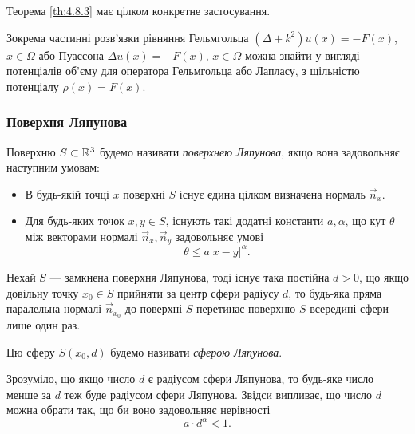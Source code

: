 \begin{remark}
	Теорема \ref{th:4.8.3} має цілком конкретне застосування.
\end{remark}

\begin{example}
	Зокрема частинні розв'язки рівняння Гельмгольца $(\Delta + k^2) u(x) = - F(x)$, $x \in \Omega$ або Пуассона $\Delta u(x) = - F(x)$, $x \in \Omega$ можна знайти у вигляді потенціалів об'єму для оператора Гельмгольца або Лапласу, з щільністю потенціалу $\rho(x) = F(x)$.
\end{example}

\subsubsection{Поверхня Ляпунова}

\begin{definition}
	Поверхню $S \subset \mathbb{R}^3$ будемо називати \textit{поверхнею Ляпунова}, якщо вона задовольняє наступним умовам:
	\begin{itemize}
		\item В будь-якій точці $x$ поверхні $S$ існує єдина цілком визначена нормаль $\vec n_x$.
		\item Для будь-яких точок $x, y \in S$, існують такі додатні константи $a, \alpha$, що кут $\theta$ між векторами нормалі $\vec n_x, \vec n_y$ задовольняє умові
		\begin{equation}
			\theta \le a |x - y|^\alpha.
		\end{equation}
	\end{itemize}
\end{definition}

\begin{theorem}
	\label{th:4.8.4}
	Нехай $S$ --- замкнена поверхня Ляпунова, тоді існує така постійна $d > 0$, що якщо довільну точку $x_0 \in S$ прийняти за центр сфери радіусу $d$, то будь-яка пряма паралельна нормалі $\vec n_{x_0}$ до поверхні $S$  перетинає поверхню $S$ всередині сфери лише один раз. 
\end{theorem}

\begin{definition}
	Цю сферу $S(x_0, d)$ будемо називати \textit{сферою Ляпунова}.
\end{definition}

\begin{remark}
	Зрозуміло, що якщо число $d$ є радіусом сфери Ляпунова, то будь-яке число менше за $d$ теж буде радіусом сфери Ляпунова. Звідси випливає, що число $d$ можна обрати так, що би воно задовольняє нерівності
	\begin{equation}
		a \cdot d^\alpha < 1.
	\end{equation}
\end{remark}

